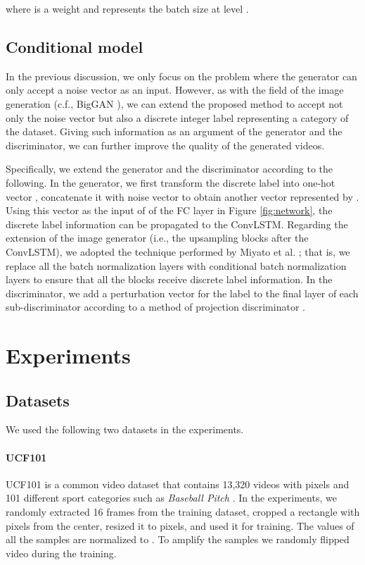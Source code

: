 \documentclass[twocolumn]{svjour3}
\def\Fig#1{Figure \ref{fig:#1}}
\begin{document}
where  is a weight and  represents the batch size at level .



\subsection{Conditional model}
\label{sec:cgan}

In the previous discussion, we only focus on the problem
where the generator can only accept a noise vector as an input.
However, as with the field of the image generation (c.f., BigGAN \cite{Brock2018}),
we can extend the proposed method to accept not only the noise vector but also a discrete integer label
representing a category of the dataset.
Giving such information as an argument of the generator and the discriminator,
we can further improve the quality of the generated videos.

Specifically, we extend the generator and the discriminator according to the following.
In the generator, we first transform the discrete label into one-hot vector ,
concatenate it with noise vector  to obtain another vector represented by .
Using this vector as the input of of the FC layer in \Fig{network},
the discrete label information can be propagated to the ConvLSTM.
Regarding the extension of the image generator (i.e., the upsampling blocks after the ConvLSTM),
we adopted the technique performed by Miyato et al. \cite{Miyato2018}; that is, we replace
all the batch normalization layers with conditional batch normalization layers to ensure that
all the blocks receive discrete label information.
In the discriminator, we add a perturbation vector for the label to the final layer of each sub-discriminator
according to a method of projection discriminator \cite{Miyato2018a}.

\section{Experiments}
\label{sec:experiments}

\subsection{Datasets}
We used the following two datasets in the experiments.

\paragraph{UCF101}
UCF101 is a common video dataset that contains
13,320 videos with  pixels and 101 different sport categories such as
{\it Baseball Pitch} \cite{Soomro2012}.
In the experiments, we randomly extracted 16 frames from the training dataset,
cropped a rectangle with  pixels from the center, resized it to  pixels,
and used it for training.
The values of all the samples are normalized to .
To amplify the samples we randomly flipped video during the training.
\end{document}
